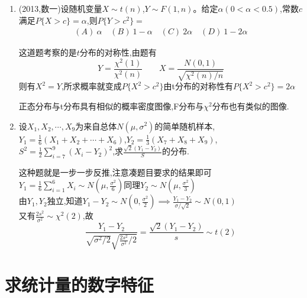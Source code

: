 \documentclass[12pt, a4paper, oneside, UTF8]{ctexbook}
\begin{document}
\begin{enumerate}[label=\arabic*.]
    \item (2013,数一)设随机变量$X\sim t(n)$,$Y\sim F(1,n)$。给定$\alpha(0<\alpha<0.5)$,常数$c$满足$P\{X>c\}=\alpha$,则$P\{Y>c^2\}=$
    \begin{align*}
        (A)\ \alpha \quad (B)\ 1-\alpha \quad (C)\ 2\alpha \quad (D)\ 1-2\alpha
    \end{align*}
    
    \begin{solution}
    这道题考察的是$t$分布的对称性,由题有
    \[
    Y=\frac{\chi^2(1)}{\chi^2(n)}\qquad X=\frac{N(0,1)}{\sqrt{\chi^2(n)/n}}
    \]
    则有$X^2=Y$,所求概率就变成$P\{X^2>c^2\}$由t分布的对称性有$P\{X^2>c^2\}=2\alpha$
    \end{solution}
    \begin{tcolorbox}[title=总结]
    正态分布与t分布具有相似的概率密度图像,F分布与$\chi^2$分布也有类似的图像.
    \end{tcolorbox}
    \item 设$X_1,X_2,\cdots,X_9$为来自总体$N(\mu,\sigma^2)$的简单随机样本,$Y_1=\frac{1}{6}(X_1+X_2+\cdots+X_6)$,$Y_2=\frac{1}{3}(X_7+X_8+X_9)$,$S^2=\frac{1}{2}\sum_{i=7}^9(X_i-Y_2)^2$,求$\frac{\sqrt{2}(Y_1-Y_2)}{S}$的分布.
    
    \begin{solution}
    这种题就是一步一步反推,注意凑题目要求的结果即可 \\
    $Y_1=\frac{1}{6}\sum_{i=1}^{6}X_i\sim N(\mu, \frac{\sigma^2}{6})$同理$Y_2\sim N(\mu,\frac{\sigma^2}{3})$ \\
    由$Y_1,Y_2$独立,知道$Y_1-Y_2\sim N(0, \frac{\sigma^2}{2})\implies \frac{Y_1-Y_2}{\sigma/\sqrt{2}}\sim N(0,1)$  \\
    又有$\frac{2s^2}{\sigma^2}\sim\chi^2(2)$,故 
    \[
    \frac{Y_1-Y_2}{\sqrt{\sigma^2/2}\sqrt{\frac{2s^2}{\sigma^2}/2}} = \frac{\sqrt{2}(Y_1-Y_2)}{s}\sim t(2)
    \]
    \end{solution}
\end{enumerate}

\section{求统计量的数字特征}
\end{document}
